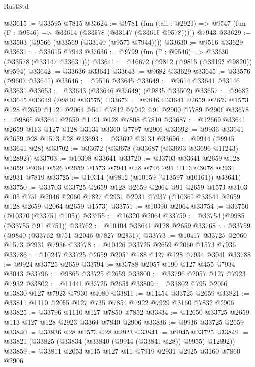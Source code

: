 \begin{lexlean}{RustStd}
\begin{coremodule}
@33615 := @33595 @7815
@33624 := @9781
    (fun (tail : @2920) => @9547 (fun (Γ : @9546) => @33614 (@33578 (@33147 (@33615 @9578)))))
    @7943
@33629 := @33503 (@9566 (@33569 (@33140 (@9575 @7944))))
@33630 := @9516 @33629
@33631 := @33615 @7943
@33636 := @9799 (fun (Γ : @9546) => @33630 (@33578 (@33147 @33631)))
@33641 := @16672 (@9812 (@9815 (@33192 @9820)) @9594)
@33642 := @33636 @33641
@33643 := @9682 @33629
@33645 := @33576 (@9607 @33641)
@33646 := @9516 @33645
@33649 := @9614 @33641 @33146 @33631
@33653 := @33643 (@33646 @33649) (@9835 @33502)
@33657 := @9682 @33645 @33649 (@9840 @33575)
@33672 := @9846
    @33641
    @2659
    @2659
    @1573
    @128
    @2659
    @1121
    @2064
    @541
    @7812
    @7942
    @91
    @2900
    @7789
    @2906
@33678 := @9865 @33641 @2659 @1121 @128 @7808 @7810
@33687 := @12669 @33641 @2659 @113 @127 @128 @3134 @3360 @7797 @2906
@33692 := @9936 @33641 @2659 @28 @1573 @28
@33693 := @33692 @3134
@33696 := @9944 (@9945 @33641 @28)
@33702 := @33672 (@33678 (@33687 (@33693 @33696 @11243) @12892))
@33703 := @10308 @33641
@33720 := @33703
    @33641
    @2659
    @128
    @2659
    @2064
    @526
    @2659
    @1573
    @7941
    @28
    @746
    @91
    @113
    @3078
    @2931
    @2931
    @7819
@33725 := @10314 (@9812 (@10159 (@13597 @10161)) @33641)
@33750 := @33703
    @33725
    @2659
    @128
    @2659
    @2064
    @91
    @2659
    @1573
    @3103
    @105
    @751
    @2046
    @2060
    @7827
    @2931
    @2931
    @7937
    (@10360 @33641 @2659 @128 @2659 @2064 @2659 @1573)
@33751 := @10390 @2064
@33754 := @33750 (@10370 (@33751 @105))
@33755 := @16320 @2064
@33759 := @33754 (@9985 (@33755 @91 @751))
@33762 := @10404 @33641 @128 @2659
@33768 := @33759 (@9840 (@33762 @751 @2046 @7827 @2931))
@33773 := @10417 @33725 @2060 @1573 @2931 @7936
@33778 := @10426 @33725 @2659 @2060 @1573 @7936
@33786 := @10247 @33725 @2659 @2057 @188 @127 @128 @7934 @3041
@33788 := @9924 @33725 @2659
@33794 := @33788 @2057 @190 @127 @455 @7934 @3043
@33796 := @9865 @33725 @2659
@33800 := @33796 @2057 @127 @7923 @7932
@33802 := @11441 @33725 @2659
@33809 := @33802 @795 @2056 @13830 @127 @7923 @7930 @4080
@33811 := @11454 @33725 @2659
@33821 := @33811 @1110 @2055 @127 @735 @7854 @7922 @7929 @3160 @7832 @2906
@33825 := @33796 @1110 @127 @7850 @7852
@33834 := @12650 @33725 @2659 @113 @127 @128 @2923 @3360 @7840 @2906
@33836 := @9936 @33725 @2659
@33840 := @33836 @28 @1573 @28 @2923
@33841 := @9945 @33725
@33849 := @33821 (@33825 (@33834 (@33840 (@9944 (@33841 @28)) @9955) @12892))
@33859 := @33811 @2053 @115 @127 @11 @7919 @2931 @2925 @3160 @7860 @2906

\end{coremodule}
\end{lexlean}
